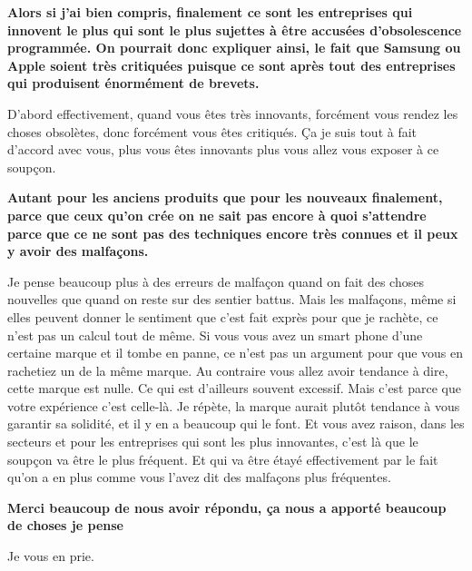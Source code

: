 \begin{small}
\textbf{Alors si j'ai bien compris, finalement ce sont les entreprises qui innovent le plus qui sont le plus sujettes à être accusées d'obsolescence programmée. On pourrait donc expliquer ainsi, le fait que Samsung ou Apple soient très critiquées puisque ce sont après tout des entreprises qui produisent énormément de brevets. }
\smallbreak


D'abord effectivement, quand vous êtes très innovants, forcément vous rendez les choses obsolètes, donc forcément vous êtes critiqués. Ça je suis tout à fait d'accord avec vous, plus vous êtes innovants plus vous allez vous exposer à ce soupçon. 

\textbf{Autant pour les anciens produits que pour les nouveaux finalement, parce que ceux qu'on crée on ne sait pas encore à quoi s'attendre parce que ce ne sont pas des  techniques  encore très connues et il peux y avoir des malfaçons.}
\smallbreak


Je pense beaucoup plus à des erreurs de malfaçon quand on fait des choses nouvelles que quand on reste sur des sentier battus. Mais les malfaçons, même si elles peuvent donner le sentiment que c'est fait exprès pour que je rachète, ce n'est pas un calcul tout de même. Si vous vous avez un smart phone d'une certaine marque et il tombe en panne, ce n'est pas un argument pour que vous en rachetiez un de la même marque. Au contraire vous allez avoir tendance à dire, cette marque est nulle. Ce qui est d'ailleurs souvent excessif. Mais c'est parce que votre expérience c'est celle-là. Je répète, la marque aurait plutôt tendance à vous garantir sa solidité, et il y en a beaucoup qui le font. Et vous avez raison, dans les secteurs et pour les entreprises qui sont les plus innovantes, c'est là que le soupçon va être le plus fréquent. Et qui va être étayé effectivement par le fait qu'on a en plus comme vous l'avez dit des malfaçons plus fréquentes. 

\textbf{Merci beaucoup de nous avoir répondu, ça nous a apporté beaucoup de choses je pense}
\smallbreak


Je vous en prie.

\end{small}
